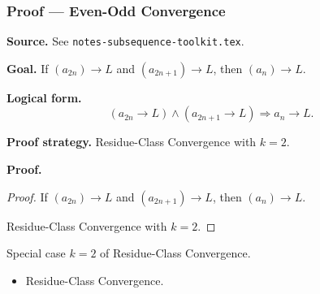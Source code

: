 
\clearpage
{}
\hypertarget{proof-RA-ABB-C-even-odd-conv}{}

\subsubsection[Even-Odd Convergence]{Proof --- Even-Odd Convergence}

\bigskip

\noindent
\textbf{Source.}
See \texttt{notes-subsequence-toolkit.tex}.

\vspace{0.75em}

\noindent
\textbf{Goal.}
If $(a_{2n}) \to L$ and $(a_{2n+1}) \to L$, then $(a_n) \to L$.

\vspace{0.75em}

\noindent
\textbf{Logical form.}
\[
  (a_{2n} \to L) \wedge (a_{2n+1} \to L) \Rightarrow a_n \to L.
\]

\vspace{0.75em}

\noindent
\textbf{Proof strategy.}
Residue-Class Convergence with $k = 2$.

\vspace{0.75em}

\noindent
\textbf{Proof.}
\begin{proof}
\Claim If $(a_{2n}) \to L$ and $(a_{2n+1}) \to L$, then $(a_n) \to L$.

\Given 

\Goal 

\Strategy Residue-Class Convergence with $k = 2$.

\medskip


\end{proof}

\begin{remark*}
Special case $k=2$ of Residue-Class Convergence.
\end{remark*}

\begin{remark*}[Dependencies]
\begin{itemize}
  \item Residue-Class Convergence.
\end{itemize}
\end{remark*}
